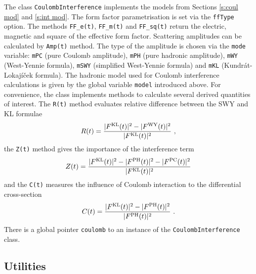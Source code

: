 \documentclass[preprint,12pt]{elsarticle}
\begin{document}
The class {\tt CoulombInterference} implements the models from Sections \ref{s:coul mod} and \ref{s:int mod}. The form factor parametrisation is set via the {\tt ffType} option. The methods {\tt FF\_e(t)}, {\tt FF\_m(t)} and {\tt FF\_sq(t)} return the electric, magnetic and square of the effective form factor. Scattering amplitudes can be calculated by {\tt Amp(t)} method. The type of the amplitude is chosen via the {\tt mode} variable: {\tt mPC} (pure Coulomb amplitude), {\tt mPH} (pure hadronic amplitude), {\tt mWY} (West-Yennie formula), {\tt mSWY} (simplified West-Yennie formula) and {\tt mKL} (Kundr\'at-Lokaj\' i\v cek formula). The hadronic model used for Coulomb interference calculations is given by the global variable {\tt model} introduced above. For convenience, the class implements methods to calculate several derived quantities of interest. The {\tt R(t)} method evaluates relative difference between the SWY and KL formulae
\begin{equation}\label{e:R}
R(t) = {|F^{\rm KL}(t)|^2 - |F^{\rm WY}(t)|^2 \over |F^{\rm KL}(t)|^2}\ ,
\end{equation}
the {\tt Z(t)} method gives the importance of the interference term
\begin{equation}\label{e:Z}
Z(t) = {|F^{\rm KL}(t)|^2 - |F^{\rm PH}(t)|^2 - |F^{\rm PC}(t)|^2 \over |F^{\rm KL}(t)|^2}
\end{equation}
and the {\tt C(t)} measures the influence of Coulomb interaction to the differential cross-section
\begin{equation}\label{e:C}
C(t) = {|F^{\rm KL}(t)|^2 - |F^{\rm PH}(t)|^2 \over |F^{\rm PH}(t)|^2} \ .
\end{equation}
There is a global pointer {\tt coulomb} to an instance of the {\tt CoulombInterference} class.


\subsection{Utilities}\label{s:prog util}
\end{document}
